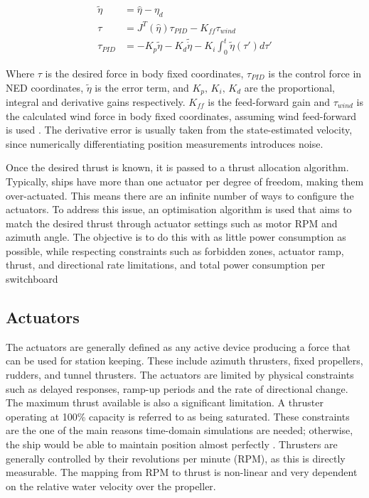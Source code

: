 \begin{align}
    \tilde{\eta} &= \hat{\eta} - \eta_d \\
    \tau &= J^T(\hat{\eta}) \tau_{PID} - K_{ff}\tau_{wind} \\
    \tau_{PID} &=  - K_p \tilde{\eta} - K_d \tilde{\dot{\eta}} - K_i \int_0^t\tilde{\eta}(\tau')d\tau'
\end{align}

Where \(\tau\) is the desired force in body fixed coordinates, \(\tau_{PID}\) is the control force in NED coordinates,
\(\tilde{\eta}\) is the error term, and \(K_p, \, K_i, \, K_d\) are the proportional, integral and derivative gains
respectively.  \(K_{ff}\) is the feed-forward gain and \(\tau_{wind}\) is the calculated wind force in body fixed coordinates, assuming wind
feed-forward is used \parencite{AssessmentStationKeeping2021}. The derivative error is usually taken from the
state-estimated velocity, since numerically differentiating position measurements introduces noise.

Once the desired thrust is known, it is passed to a thrust allocation algorithm. Typically, ships have more than one
actuator per degree of freedom, making them over-actuated. This means there are an infinite number of ways to configure
the actuators. To address this issue, an optimisation algorithm is used that aims to match the desired thrust through
actuator settings such as motor RPM and azimuth angle. The objective is to do this with as little power consumption
as possible, while respecting constraints such as forbidden zones, actuator ramp, thrust, and directional rate limitations, and total power consumption per switchboard \parencite{overengDynamicPositioningUsing2021}


\subsection{Actuators}
\label{subsec:actuators}
The actuators are generally defined as any active device producing a force that can be used for station keeping. These
include azimuth thrusters, fixed propellers, rudders, and tunnel thrusters. The actuators are limited by physical
constraints such as delayed responses, ramp-up periods and the rate of directional change. The maximum thrust available is also a
significant limitation. A thruster operating at 100\% capacity is referred to as being saturated. These constraints are
the one of the main reasons time-domain simulations are needed; otherwise, the ship would be able to maintain position almost perfectly
\parencite{borhaugExperimentalValidationDynamic2012}. Thrusters are generally controlled by their revolutions per
minute (RPM), as this is directly measurable. The mapping from RPM to thrust is non-linear and very dependent on the
relative water velocity over the propeller.

